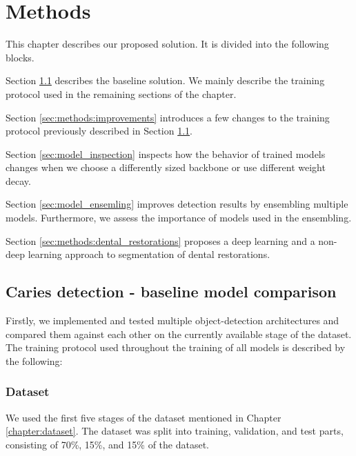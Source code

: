 \chapter{Methods}
\label{chapter:methods}
This chapter describes our proposed solution. It is divided into the following blocks.

\medskip 
Section \ref{sec:caries_detection} describes the baseline solution. We mainly describe the training protocol used in the remaining sections of the chapter.

\medskip Section \ref{sec:methods:improvements} introduces a few changes to the training protocol previously described in Section \ref{sec:caries_detection}.

\medskip Section \ref{sec:model_inspection} inspects how the behavior of trained models changes when we choose a differently sized backbone or use different weight decay.

\medskip Section \ref{sec:model_ensemling} improves detection results by ensembling multiple models. Furthermore, we assess the importance of models used in the ensembling.

\medskip Section \ref{sec:methods:dental_restorations} proposes a deep learning and a non-deep learning approach to segmentation of dental restorations.

\section{Caries detection - baseline model comparison}
\label{sec:caries_detection}

Firstly, we implemented and tested multiple object-detection architectures and compared them against each other on the currently available stage of the dataset. The training protocol used throughout the training of all models is described by the following:

\subsection{Dataset}
We used the first five stages of the dataset mentioned in Chapter \ref{chapter:dataset}. The dataset was split into training, validation, and test parts, consisting of 70\%, 15\%, and 15\% of the dataset.

